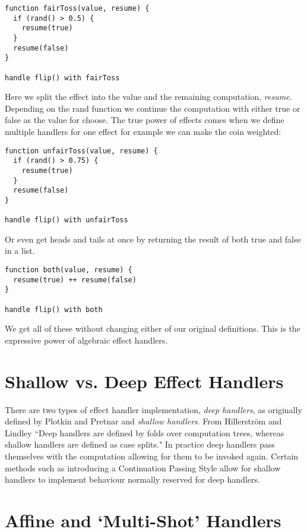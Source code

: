 \documentclass[logo,bsc,singlespacing,parskip]{infthesis}
\begin{document}
\begin{lstlisting}
function fairToss(value, resume) {
  if (rand() > 0.5) {
    resume(true)
  }
  resume(false)
}

handle flip() with fairToss
\end{lstlisting}

Here we split the effect into the value and the remaining computation,
\emph{resume}. Depending on the rand function we continue the computation with
either true or false as the value for choose. The true power of effects comes when we define multiple handlers for one effect for example we can make the coin weighted:

\begin{lstlisting}
function unfairToss(value, resume) {
  if (rand() > 0.75) {
    resume(true)
  }
  resume(false)
}

handle flip() with unfairToss
\end{lstlisting}

Or even get heads and tails at once by returning the result of both true and
false in a list.

\begin{lstlisting}
function both(value, resume) {
  resume(true) ++ resume(false)
}

handle flip() with both
\end{lstlisting}

We get all of these without changing either of our original definitions. This
is the expressive power of algebraic effect handlers.

\section{Shallow vs. Deep Effect Handlers}

There are two types of effect handler implementation, \emph{deep handlers}, as
originally defined by Plotkin and Pretnar \cite{plotkin2009handlers} and
\emph{shallow handlers}. From Hillerstr\"{o}m and Lindley
\cite{hillerstrom2018shallow} ``Deep handlers are defined by folds over
computation trees, whereas shallow handlers are defined as case splits." In
practice deep handlers pass themselves with the computation allowing for them to
be invoked again. Certain methods such as introducing a Continuation Passing
Style allow for shallow handlers to implement behaviour normally reserved for
deep handlers.

\section{Affine and `Multi-Shot' Handlers}
\end{document}
